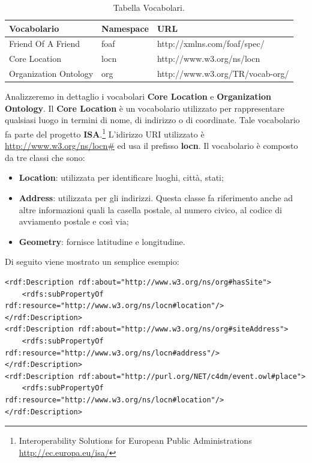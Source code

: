 \documentclass[a4paper,11pt]{article}
\begin{document}
\begin{table}[!htbp]
\begin{center}				
\begin{tabular}{|>{\small}l|>{\small}l|>{\small}l|}
	\hline	\textbf{Vocabolario} & \textbf{Namespace} & \textbf{URL}\\				
	\hline	Friend Of A Friend & foaf & http://xmlns.com/foaf/spec/\\
	\hline	Core Location & locn & http://www.w3.org/ns/locn\\
	\hline	Organization Ontology & org & http://www.w3.org/TR/vocab-org/\\
	\hline			
\end{tabular}	
\caption{Tabella Vocabolari.}	
\end{center}	
\end{table}
Analizzeremo in dettaglio i vocabolari \textbf{Core Location} e \textbf{Organization Ontology}.
Il \textbf{Core Location} è un vocabolario utilizzato per rappresentare qualsiasi luogo in termini di nome, di indirizzo o di coordinate. Tale vocabolario fa parte del progetto \textbf{ISA}.\footnote{Interoperability Solutions for European Public Administrations \url{http://ec.europa.eu/isa/}} L'idirizzo URI utilizzato è \url{http://www.w3.org/ns/locn\#} ed usa il prefisso \textbf{locn}. \newline Il vocabolario è composto da tre classi che sono:
\begin{itemize}
	\item \textbf{Location}: utilizzata per identificare luoghi, città, stati;  
	\item \textbf{Address}: utilizzata per gli indirizzi. Questa classe fa riferimento anche ad altre informazioni quali la casella postale, al numero civico, al codice di avviamento postale e così via;
	\item \textbf{Geometry}: fornisce latitudine e longitudine.
\end{itemize} 
Di seguito viene mostrato un semplice esempio:
\begin{lstlisting}[style=htmlcssjs]
<rdf:Description rdf:about="http://www.w3.org/ns/org#hasSite">
	<rdfs:subPropertyOf rdf:resource="http://www.w3.org/ns/locn#location"/>
</rdf:Description>
<rdf:Description rdf:about="http://www.w3.org/ns/org#siteAddress">
	<rdfs:subPropertyOf rdf:resource="http://www.w3.org/ns/locn#address"/>
</rdf:Description>
<rdf:Description rdf:about="http://purl.org/NET/c4dm/event.owl#place">
	<rdfs:subPropertyOf rdf:resource="http://www.w3.org/ns/locn#location"/>
</rdf:Description>
\end{lstlisting}
\end{document}
